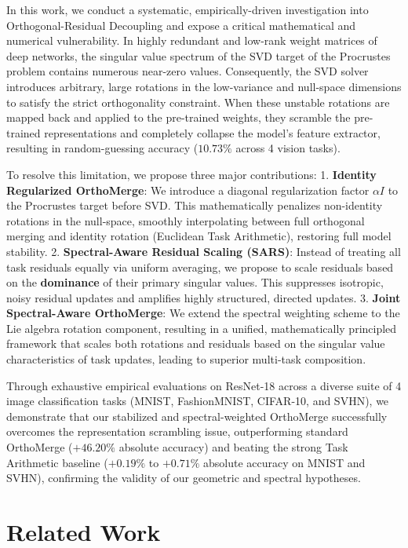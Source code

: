 \documentclass{article}
\theoremstyle{plain}
\theoremstyle{definition}
\theoremstyle{remark}
\begin{document}
In this work, we conduct a systematic, empirically-driven investigation into Orthogonal-Residual Decoupling and expose a critical mathematical and numerical vulnerability. In highly redundant and low-rank weight matrices of deep networks, the singular value spectrum of the SVD target of the Procrustes problem contains numerous near-zero values. Consequently, the SVD solver introduces arbitrary, large rotations in the low-variance and null-space dimensions to satisfy the strict orthogonality constraint. When these unstable rotations are mapped back and applied to the pre-trained weights, they scramble the pre-trained representations and completely collapse the model's feature extractor, resulting in random-guessing accuracy ($10.73\%$ across 4 vision tasks).

To resolve this limitation, we propose three major contributions:
1. \textbf{Identity Regularized OrthoMerge}: We introduce a diagonal regularization factor $\alpha I$ to the Procrustes target before SVD. This mathematically penalizes non-identity rotations in the null-space, smoothly interpolating between full orthogonal merging and identity rotation (Euclidean Task Arithmetic), restoring full model stability.
2. \textbf{Spectral-Aware Residual Scaling (SARS)}: Instead of treating all task residuals equally via uniform averaging, we propose to scale residuals based on the \textbf{dominance} of their primary singular values. This suppresses isotropic, noisy residual updates and amplifies highly structured, directed updates.
3. \textbf{Joint Spectral-Aware OrthoMerge}: We extend the spectral weighting scheme to the Lie algebra rotation component, resulting in a unified, mathematically principled framework that scales both rotations and residuals based on the singular value characteristics of task updates, leading to superior multi-task composition.

Through exhaustive empirical evaluations on ResNet-18 across a diverse suite of 4 image classification tasks (MNIST, FashionMNIST, CIFAR-10, and SVHN), we demonstrate that our stabilized and spectral-weighted OrthoMerge successfully overcomes the representation scrambling issue, outperforming standard OrthoMerge ($+46.20\%$ absolute accuracy) and beating the strong Task Arithmetic baseline ($+0.19\%$ to $+0.71\%$ absolute accuracy on MNIST and SVHN), confirming the validity of our geometric and spectral hypotheses.

\section{Related Work}
\label{sec:related}
\end{document}
